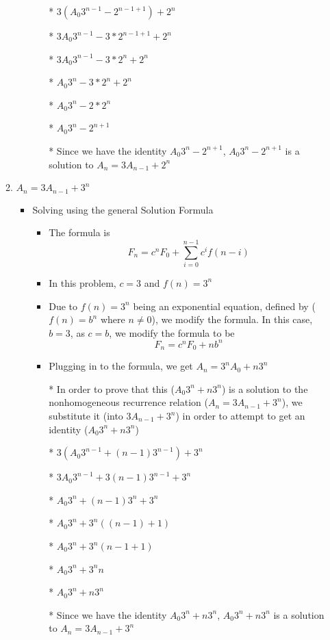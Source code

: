 \begin{enumerate}
\begin{enumerate}
\begin{itemize}
\begin{itemize}
      \item [*] $3(A_{0}3^{n-1}-2^{n-1+1})+2^{n}$
      \item [*] $3A_{0}3^{n-1}-3*2^{n-1+1}+2^{n}$
      \item [*] $3A_{0}3^{n-1}-3*2^{n}+2^{n}$
      \item [*] $A_{0}3^{n}-3*2^{n}+2^{n}$
      \item [*] $A_{0}3^{n}-2*2^{n}$
      \item [*] $A_{0}3^{n}-2^{n+1}$
      \item [*] Since we have the identity $A_{0}3^{n}-2^{n+1}$, $A_{0}3^{n}-2^{n+1}$ is a solution to $A_{n}=3A_{n-1}+2^{n}$
      \end{itemize} %
    \end{itemize} %
  \item $A_{n}=3A_{n-1}+3^{n}$
    \begin{itemize}
    \item Solving using the general Solution Formula
      \begin{itemize} %
      \item The formula is $$F_{n}=c^{n}F_{0} + \sum\limits_{i=0}^{n-1}c^{i}f(n-i)$$
      \item In this problem, $c=3$ and $f(n)=3^{n}$
      \item Due to $f(n)=3^{n}$ being an exponential equation, defined by ($f(n)=b^{n}$ where $n\neq0$), we modify the formula. In this case, $b=3$, as $c= b$, we modify the formula to be $$F_{n}=c^{n}F_{0} + nb^{n}$$
      \item Plugging in to the formula, we get $A_{n}=3^{n}A_{0} + n3^{n}$
      \item [*] In order to prove that this ($A_{0}3^{n}+n3^{n}$) is a solution to the nonhomogeneous recurrence relation ($A_{n}=3A_{n-1}+3^{n}$), we substitute it (into $3A_{n-1}+3^{n}$) in order to attempt to get an identity ($A_{0}3^{n}+n3^{n}$)
      \item [*] $3(A_{0}3^{n-1} + (n-1)3^{n-1}) + 3^{n}$
      \item [*] $3A_{0}3^{n-1} + 3(n-1)3^{n-1} + 3^{n}$
      \item [*] $A_{0}3^{n} + (n-1)3^{n} + 3^{n}$
      \item [*] $A_{0}3^{n} + 3^{n}((n-1) + 1)$
      \item [*] $A_{0}3^{n} + 3^{n}(n-1+1)$
      \item [*] $A_{0}3^{n} + 3^{n}n$
      \item [*] $A_{0}3^{n} + n3^{n}$
      \item [*] Since we have the identity $A_{0}3^{n}+n3^{n}$, $A_{0}3^{n}+n3^{n}$ is a solution to $A_{n}=3A_{n-1}+3^{n}$

\end{itemize}
\end{itemize}
\end{enumerate}
\end{enumerate}
